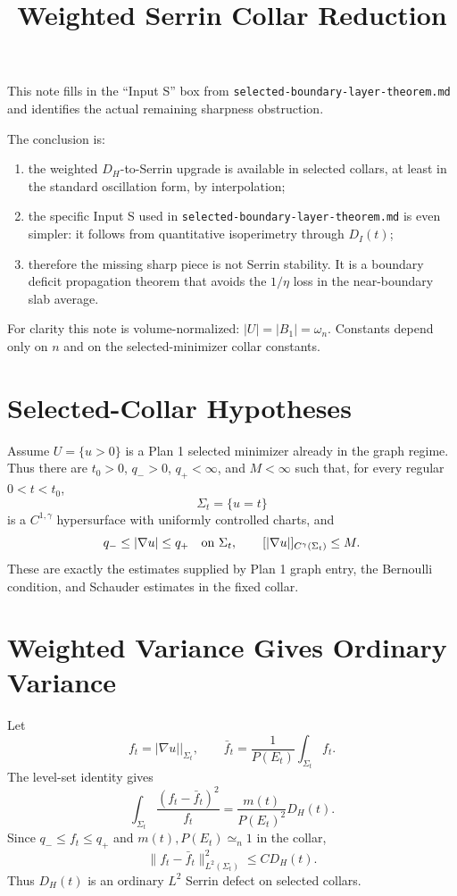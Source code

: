 \documentclass[11pt]{article}
\title{Weighted Serrin Collar Reduction}
\author{}
\date{}
\begin{document}
\maketitle

This note fills in the ``Input S'' box from
\texttt{selected-boundary-layer-theorem.md} and identifies the actual remaining
sharpness obstruction.

The conclusion is:
\begin{enumerate}
\item the weighted \(D_H\)-to-Serrin upgrade is available in selected collars,
at least in the standard oscillation form, by interpolation;
\item the specific Input S used in
\texttt{selected-boundary-layer-theorem.md} is even simpler: it follows from
quantitative isoperimetry through \(D_I(t)\);
\item therefore the missing sharp piece is not Serrin stability. It is a
boundary deficit propagation theorem that avoids the \(1/\eta\) loss in the
near-boundary slab average.
\end{enumerate}

For clarity this note is volume-normalized: \(|U|=|B_1|=\omega_n\). Constants
depend only on \(n\) and on the selected-minimizer collar constants.

\section{Selected-Collar Hypotheses}

Assume \(U=\{u>0\}\) is a Plan 1 selected minimizer already in the graph
regime. Thus there are \(t_0>0\), \(q_->0\), \(q_+<\infty\), and \(M<\infty\)
such that, for every regular \(0<t<t_0\),
\[
\Sigma_t=\{u=t\}
\]
is a \(C^{1,\gamma}\) hypersurface with uniformly controlled charts, and
\[
q_-\le |\nabla u|\le q_+
\quad\hbox{on }\Sigma_t,
\qquad
[|\nabla u|]_{C^\gamma(\Sigma_t)}\le M.
\]
These are exactly the estimates supplied by Plan 1 graph entry, the Bernoulli
condition, and Schauder estimates in the fixed collar.

\section{Weighted Variance Gives Ordinary Variance}

Let
\[
f_t=|\nabla u|\big|_{\Sigma_t},
\qquad
\bar f_t=\frac1{P(E_t)}\int_{\Sigma_t} f_t.
\]
The level-set identity gives
\[
\int_{\Sigma_t}\frac{(f_t-\bar f_t)^2}{f_t}
=
\frac{m(t)}{P(E_t)^2}D_H(t).
\]
Since \(q_-\le f_t\le q_+\) and \(m(t),P(E_t)\simeq_n1\) in the collar,
\[
\|f_t-\bar f_t\|_{L^2(\Sigma_t)}^2
\le C D_H(t).
\]
Thus \(D_H(t)\) is an ordinary \(L^2\) Serrin defect on selected collars.
\end{document}
